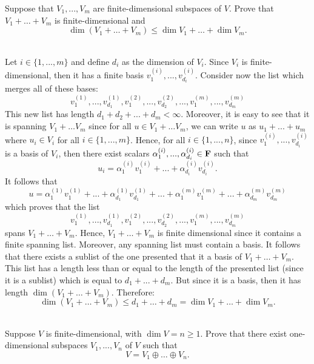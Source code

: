 \begin{exercise}
    Suppose that $V_1, ..., V_m$ are finite-dimensional subspaces of $V$. Prove that $V_1 + \dots + V_m$ is finite-dimensional and
    $$\dim(V_1 + \dots + V_m) \leq \dim V_1 + \dots + \dim V_m.$$
\end{exercise}

\begin{solution}
    \\ Let $i \in \{1, ..., m\}$ and define $d_i$ as the dimension of $V_i$. Since $V_i$ is finite-dimensional, then it has a finite basis $v_1^{(i)}, ..., v_{d_i}^{(i)}$. Consider now the list which merges all of these bases:
    $$v_1^{(1)}, ..., v_{d_1}^{(1)}, v_1^{(2)}, ..., v_{d_2}^{(2)}, ..., v_1^{(m)}, ..., v_{d_m}^{(m)}$$
    This new list has length $d_1 + d_2 + ... + d_m < \infty$. Moreover, it is easy to see that it is spanning $V_1 + \dots V_m$ since for all $u \in V_1 + \dots V_m$, we can write $u$ as $u_1 + ... + u_m$ where $u_i \in V_i$ for all $i \in \{1, ..., m\}$. Hence, for all $i \in \{1, ..., n\}$, since $v_1^{(i)}, ..., v_{d_i}^{(i)}$ is a basis of $V_i$, then there exist scalars $\alpha_1^{(i)}, ..., \alpha_{d_i}^{(i)} \in \mathbf{F}$ such that
    $$u_i = \alpha_1^{(i)} v_1^{(i)} + ... + \alpha_{d_i}^{(i)} v_{d_i}^{(i)}.$$
    It follows that
    $$u = \alpha_1^{(1)} v_1^{(1)} + ... + \alpha_{d_1}^{(1)} v_{d_1}^{(1)} + ... + \alpha_1^{(m)} v_1^{(m)} + ... + \alpha_{d_m}^{(m)} v_{d_m}^{(m)}$$
    which proves that the list
    $$v_1^{(1)}, ..., v_{d_1}^{(1)}, v_1^{(2)}, ..., v_{d_2}^{(2)}, ..., v_1^{(m)}, ..., v_{d_m}^{(m)}$$
    spans $V_1 + \dots + V_m$. Hence, $V_1 + \dots + V_m$ is finite dimensional since it contains a finite spanning list. Moreover, any spanning list must contain a basis. It follows that there exists a sublist of the one presented that it a basis of $V_1 + \dots + V_m$. This list has a length less than or equal to the length of the presented list (since it is a sublist) which is equal to $d_1 + ... + d_m$. But since it is a basis, then it has length $\dim (V_1 + \dots + V_m)$. Therefore:
    $$\dim (V_1 + \dots + V_m) \leq d_1 + \dots + d_m = \dim V_1 + \dots + \dim V_m.$$ \\
\end{solution}

\begin{exercise}
    Suppose $V$ is finite-dimensional, with $\dim V = n \geq 1$. Prove that there exist one-dimensional subspaces $V_1, ..., V_n$ of $V$ such that
    $$V = V_1 \oplus \dots \oplus V_n.$$
\end{exercise}

